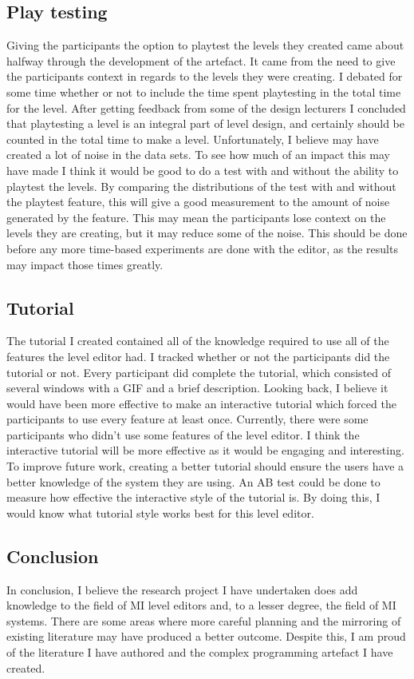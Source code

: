 \documentclass[journal]{IEEEtran}
\begin{document}
\subsection{Play testing}\label{ptest}
Giving the participants the option to playtest the levels they created came about halfway through the development of the artefact. It came from the need to give the participants context in regards to the levels they were creating. I debated for some time whether or not to include the time spent playtesting in the total time for the level. After getting feedback from some of the design lecturers I concluded that playtesting a level is an integral part of level design, and certainly should be counted in the total time to make a level. Unfortunately, I believe may have created a lot of noise in the data sets. To see how much of an impact this may have made I think it would be good to do a test with and without the ability to playtest the levels. By comparing the distributions of the test with and without the playtest feature, this will give a good measurement to the amount of noise generated by the feature. This may mean the participants lose context on the levels they are creating, but it may reduce some of the noise. This should be done before any more time-based experiments are done with the editor, as the results may impact those times greatly.

\subsection{Tutorial}
The tutorial I created contained all of the knowledge required to use all of the features the level editor had. I tracked whether or not the participants did the tutorial or not. Every participant did complete the tutorial, which consisted of several windows with a GIF and a brief description. Looking back, I believe it would have been more effective to make an interactive tutorial which forced the participants to use every feature at least once. Currently, there were some participants who didn't use some features of the level editor. I think the interactive tutorial will be more effective as it would be engaging and interesting. To improve future work, creating a better tutorial should ensure the users have a better knowledge of the system they are using. An AB test could be done to measure how effective the interactive style of the tutorial is. By doing this, I would know what tutorial style works best for this level editor. 

\subsection{Conclusion}
In conclusion, I believe the research project I have undertaken does add knowledge to the field of MI level editors and, to a lesser degree, the field of MI systems. There are some areas where more careful planning and the mirroring of existing literature may have produced a better outcome. Despite this, I am proud of the literature I have authored and the complex programming artefact I have created.

\end{document}
